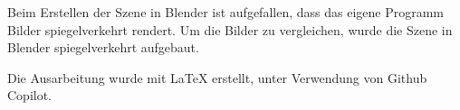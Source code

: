 \documentclass[a4paper, 10pt]{article}
\begin{document}
Beim Erstellen der Szene in Blender ist aufgefallen, dass das eigene Programm Bilder spiegelverkehrt rendert.
Um die Bilder zu vergleichen, wurde die Szene in Blender spiegelverkehrt aufgebaut.

\printbibliography[heading=bibintoc, title=Quellen]
Die Ausarbeitung wurde mit \LaTeX{} erstellt, unter Verwendung von Github Copilot.
\end{document}
